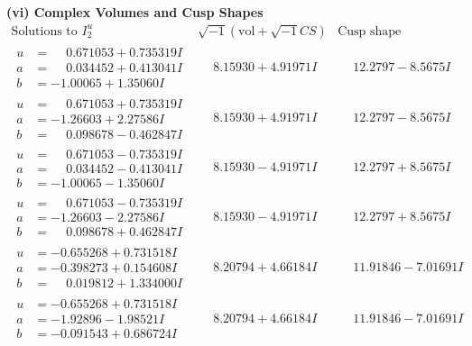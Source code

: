 \documentclass[1p]{elsarticle_modified}
\theoremstyle{definition}
\newcommand{\I}{\sqrt{-1}}
\begin{document}
\newpage\flushleft \textbf{(vi) Complex Volumes and Cusp Shapes}
$$\begin{array}{c|c|c}  
\text{Solutions to }I^u_{2}& \I (\text{vol} + \sqrt{-1}CS) & \text{Cusp shape}\\
 \hline 
\begin{aligned}
u &= \phantom{-}0.671053 + 0.735319 I \\
a &= \phantom{-}0.034452 + 0.413041 I \\
b &= -1.00065 + 1.35060 I\end{aligned}
 & \phantom{-}8.15930 + 4.91971 I & \phantom{-}12.2797 - 8.5675 I \\ \hline\begin{aligned}
u &= \phantom{-}0.671053 + 0.735319 I \\
a &= -1.26603 + 2.27586 I \\
b &= \phantom{-}0.098678 - 0.462847 I\end{aligned}
 & \phantom{-}8.15930 + 4.91971 I & \phantom{-}12.2797 - 8.5675 I \\ \hline\begin{aligned}
u &= \phantom{-}0.671053 - 0.735319 I \\
a &= \phantom{-}0.034452 - 0.413041 I \\
b &= -1.00065 - 1.35060 I\end{aligned}
 & \phantom{-}8.15930 - 4.91971 I & \phantom{-}12.2797 + 8.5675 I \\ \hline\begin{aligned}
u &= \phantom{-}0.671053 - 0.735319 I \\
a &= -1.26603 - 2.27586 I \\
b &= \phantom{-}0.098678 + 0.462847 I\end{aligned}
 & \phantom{-}8.15930 - 4.91971 I & \phantom{-}12.2797 + 8.5675 I \\ \hline\begin{aligned}
u &= -0.655268 + 0.731518 I \\
a &= -0.398273 + 0.154608 I \\
b &= \phantom{-}0.019812 + 1.334000 I\end{aligned}
 & \phantom{-}8.20794 + 4.66184 I & \phantom{-}11.91846 - 7.01691 I \\ \hline\begin{aligned}
u &= -0.655268 + 0.731518 I \\
a &= -1.92896 - 1.98521 I \\
b &= -0.091543 + 0.686724 I\end{aligned}
 & \phantom{-}8.20794 + 4.66184 I & \phantom{-}11.91846 - 7.01691 I \\ \hline\begin{aligned}

\end{aligned}
\end{array}$$
\end{document}
